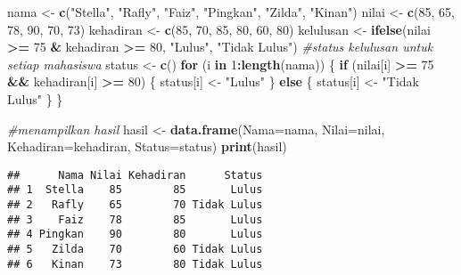 \documentclass[
]{article}
\newenvironment{Shaded}{\begin{snugshade}}{\end{snugshade}}
\newcommand{\AttributeTok}[1]{\textcolor[rgb]{0.13,0.29,0.53}{#1}}
\newcommand{\CommentTok}[1]{\textcolor[rgb]{0.56,0.35,0.01}{\textit{#1}}}
\newcommand{\ControlFlowTok}[1]{\textcolor[rgb]{0.13,0.29,0.53}{\textbf{#1}}}
\newcommand{\DecValTok}[1]{\textcolor[rgb]{0.00,0.00,0.81}{#1}}
\newcommand{\FunctionTok}[1]{\textcolor[rgb]{0.13,0.29,0.53}{\textbf{#1}}}
\newcommand{\NormalTok}[1]{#1}
\newcommand{\OtherTok}[1]{\textcolor[rgb]{0.56,0.35,0.01}{#1}}
\newcommand{\SpecialCharTok}[1]{\textcolor[rgb]{0.81,0.36,0.00}{\textbf{#1}}}
\newcommand{\StringTok}[1]{\textcolor[rgb]{0.31,0.60,0.02}{#1}}
\begin{document}
\begin{Shaded}
\begin{Highlighting}[]
\NormalTok{nama }\OtherTok{\textless{}{-}} \FunctionTok{c}\NormalTok{(}\StringTok{"Stella"}\NormalTok{, }\StringTok{"Rafly"}\NormalTok{, }\StringTok{"Faiz"}\NormalTok{, }\StringTok{"Pingkan"}\NormalTok{, }\StringTok{"Zilda"}\NormalTok{, }\StringTok{"Kinan"}\NormalTok{)}
\NormalTok{nilai }\OtherTok{\textless{}{-}} \FunctionTok{c}\NormalTok{(}\DecValTok{85}\NormalTok{, }\DecValTok{65}\NormalTok{, }\DecValTok{78}\NormalTok{, }\DecValTok{90}\NormalTok{, }\DecValTok{70}\NormalTok{, }\DecValTok{73}\NormalTok{)}
\NormalTok{kehadiran }\OtherTok{\textless{}{-}} \FunctionTok{c}\NormalTok{(}\DecValTok{85}\NormalTok{, }\DecValTok{70}\NormalTok{, }\DecValTok{85}\NormalTok{, }\DecValTok{80}\NormalTok{, }\DecValTok{60}\NormalTok{, }\DecValTok{80}\NormalTok{)}
\NormalTok{kelulusan }\OtherTok{\textless{}{-}} \FunctionTok{ifelse}\NormalTok{(nilai }\SpecialCharTok{\textgreater{}=} \DecValTok{75} \SpecialCharTok{\&}\NormalTok{ kehadiran }\SpecialCharTok{\textgreater{}=} \DecValTok{80}\NormalTok{, }\StringTok{"Lulus"}\NormalTok{, }\StringTok{"Tidak Lulus"}\NormalTok{)}
\CommentTok{\#status kelulusan untuk setiap mahasiswa }
\NormalTok{status }\OtherTok{\textless{}{-}} \FunctionTok{c}\NormalTok{()}
\ControlFlowTok{for}\NormalTok{ (i }\ControlFlowTok{in} \DecValTok{1}\SpecialCharTok{:}\FunctionTok{length}\NormalTok{(nama)) \{}
  \ControlFlowTok{if}\NormalTok{ (nilai[i] }\SpecialCharTok{\textgreater{}=} \DecValTok{75} \SpecialCharTok{\&\&}\NormalTok{ kehadiran[i] }\SpecialCharTok{\textgreater{}=} \DecValTok{80}\NormalTok{) \{}
\NormalTok{    status[i] }\OtherTok{\textless{}{-}} \StringTok{"Lulus"}
\NormalTok{  \} }\ControlFlowTok{else}\NormalTok{ \{}
\NormalTok{    status[i] }\OtherTok{\textless{}{-}} \StringTok{"Tidak Lulus"}
\NormalTok{  \}}
\NormalTok{\}}

\CommentTok{\#menampilkan hasil}
\NormalTok{hasil }\OtherTok{\textless{}{-}} \FunctionTok{data.frame}\NormalTok{(}\AttributeTok{Nama=}\NormalTok{nama, }\AttributeTok{Nilai=}\NormalTok{nilai, }\AttributeTok{Kehadiran=}\NormalTok{kehadiran, }\AttributeTok{Status=}\NormalTok{status)}
\FunctionTok{print}\NormalTok{(hasil)}
\end{Highlighting}
\end{Shaded}

\begin{verbatim}
##      Nama Nilai Kehadiran      Status
## 1  Stella    85        85       Lulus
## 2   Rafly    65        70 Tidak Lulus
## 3    Faiz    78        85       Lulus
## 4 Pingkan    90        80       Lulus
## 5   Zilda    70        60 Tidak Lulus
## 6   Kinan    73        80 Tidak Lulus
\end{verbatim}
\end{document}
